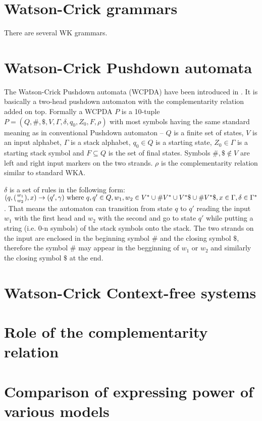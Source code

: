 \section{Watson-Crick grammars}
There are several WK grammars.


\section{Watson-Crick Pushdown automata}
The Watson-Crick Pushdown automata (WCPDA) have been introduced in \cite{WK_PUSHDOWN_AUT}. It is basically a two-head pushdown automaton with the complementarity relation added on top. Formally a WCPDA $P$ is a 10-tuple $P = (Q, \#, \$, V, \Gamma, \delta, q_0, Z_0, F, \rho)$ with most symbols having the same standard meaning as in conventional Pushdown automaton -- $Q$ is a finite set of states, $V$ is an input alphabet, $\Gamma$ is a stack alphabet, $q_0 \in Q$ is a starting state, $Z_0 \in \Gamma$ is a starting stack symbol and $F \subseteq Q$ is the set of final states. Symbols $\#, \$ \notin V$ are left and right input markers on the two strands. $\rho$ is the complementarity relation similar to standard WKA.

$\delta$ is a set of rules in the following form: $(q, ({w_1 \atop w_2}), x) \rightarrow (q', \gamma) \textnormal{ where } q, q' \in Q, w_1, w_2 \in V^* \cup \#V^* \cup V^*\$ \cup \#V^*\$, x \in \Gamma, \delta \in \Gamma^*$. That means the automaton can transition from state $q$ to $q'$ reading the input $w_1$ with the first head and $w_2$ with the second and go to state $q'$ while putting a string (i.e. 0-n symbols) of the stack symbols onto the stack. The two strands on the input are enclosed in the beginning symbol $\#$ and the closing symbol $\$$, therefore the symbol $\#$ may appear in the begginning of $w_1$ or $w_2$ and similarly the closing symbol $\$$ at the end.




\section{Watson-Crick Context-free systems}

\section{Role of the complementarity relation}

\section{Comparison of expressing power of various models}

